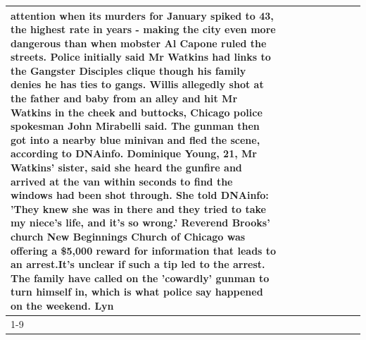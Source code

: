 \begin{table}[H]
\begin{tabular}{lllrlllll}
attention when its murders for January spiked to 43, the highest rate in years - making the city even more dangerous than when mobster Al Capone ruled the streets. Police initially said Mr Watkins had links to the Gangster Disciples clique though his family denies he has ties to gangs. Willis allegedly shot at the father and baby from an alley and hit Mr Watkins in the cheek and buttocks, Chicago police spokesman John Mirabelli said. The gunman then got into a nearby blue minivan and fled the scene, according to DNAinfo. Dominique Young, 21, Mr Watkins' sister, said she heard the gunfire and arrived at the van within seconds to find the windows had been shot through. She told DNAinfo: 'They knew she was in there and they tried to take my niece's life, and it's so wrong.' Reverend Brooks' church New Beginnings Church of Chicago was offering a \$5,000 reward for information that leads to an arrest.It's unclear if such a tip led to the arrest. The family have called on the 'cowardly' gunman to turn himself in, which is what police say happened on the weekend. Lyn \\
\cline{1-9}

\end{tabular}
\end{table}
